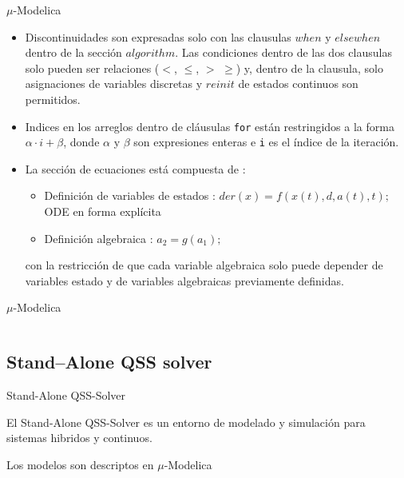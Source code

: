 \documentclass[10pt,handout]{beamer}
\begin{document}
\begin{frame}{$\mu$-Modelica}
	 \begin{itemize}
	 \item<1-> Discontinuidades son expresadas solo con las clausulas $when$ y $elsewhen$ dentro de la sección $algorithm$. Las condiciones dentro de las dos 
	clausulas solo pueden ser relaciones ($<$, $\leqslant$, $>$ $\geqslant$) y, dentro de la clausula, solo asignaciones de variables discretas y $reinit$ 
	de estados continuos son permitidos.

	\item<2-> Indices en los arreglos dentro de cláusulas \texttt{for} están restringidos a la forma $\alpha \cdot i + \beta$, donde $\alpha$ y $\beta$ son expresiones enteras e \texttt{i} es el índice de la iteración.
	\item<3-> La sección de ecuaciones está compuesta de :
	 \begin{itemize}
		\item Definición de variables de estados : $der(x) =  f (x(t), d, a(t), t);$ ODE en forma explícita
		\item Definición algebraica : $a_2  = g(a_1);$
	 \end{itemize}
	 con la restricción de que cada variable algebraica solo puede depender de variables estado y de variables algebraicas previamente definidas.
	\end{itemize}
\end{frame}

\begin{frame}{$\mu$-Modelica}
	\inputminted[linenos]{modelica}{slides/lotka_volterra_qss.mo}
\end{frame}

	\subsection{Stand–Alone QSS solver}

\begin{frame}{Stand-Alone QSS-Solver}

\begin{block}{El Stand-Alone QSS-Solver}
es un entorno de modelado y simulación para sistemas hibridos y continuos.
\end{block}

\begin{block}{Los modelos}
son  descriptos en $\mu$-Modelica
\end{block}
\end{frame}
\end{document}

